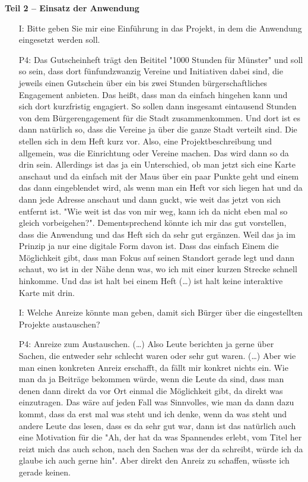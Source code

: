 \textbf{Teil 2 -- Einsatz der Anwendung}
\begin{itemize}
    \item[I:] Bitte geben Sie mir eine Einf{\"u}hrung in das Projekt, in dem die Anwendung eingesetzt werden soll.
    \item[P4:] Das Gutscheinheft tr{\"a}gt den Beititel "1000 Stunden f{\"u}r M{\"u}nster" und soll so sein, dass dort f{\"u}nfundzwanzig Vereine und Initiativen dabei sind, die jeweils einen Gutschein {\"u}ber ein bis zwei Stunden b{\"u}rgerschaftliches Engagement anbieten. Das hei{\ss}t, dass man da einfach hingehen kann und sich dort kurzfristig engagiert. So sollen dann insgesamt eintausend Stunden von dem B{\"u}rgerengagement f{\"u}r die Stadt zusammenkommen. Und dort ist es dann nat{\"u}rlich so, dass die Vereine ja {\"u}ber die ganze Stadt verteilt sind. Die stellen sich in dem Heft kurz vor. Also, eine Projektbeschreibung und allgemein, was die Einrichtung oder Vereine machen. Das wird dann so da drin sein. Allerdings ist das ja ein Unterschied, ob man jetzt sich eine Karte anschaut und da einfach mit der Maus {\"u}ber ein paar Punkte geht und einem das dann eingeblendet wird, als wenn man ein Heft vor sich liegen hat und da dann jede Adresse anschaut und dann guckt, wie weit das jetzt von sich entfernt ist. "Wie weit ist das von mir weg, kann ich da nicht eben mal so gleich vorbeigehen?". Dementsprechend k{\"o}nnte ich mir das gut vorstellen, dass die Anwendung und das Heft sich da sehr gut erg{\"a}nzen. Weil das ja im Prinzip ja nur eine digitale Form davon ist. Dass das einfach Einem die M{\"o}glichkeit gibt, dass man Fokus auf seinen Standort gerade legt und dann schaut, wo ist in der N{\"a}he denn was, wo ich mit einer kurzen Strecke schnell hinkomme. Und das ist halt bei einem Heft (\dots) ist halt keine interaktive Karte mit drin.
    \item[I:] Welche Anreize k{\"o}nnte man geben, damit sich B{\"u}rger {\"u}ber die eingestellten Projekte austauschen?
    \item[P4:] Anreize zum Austauschen. (\dots) Also Leute berichten ja gerne {\"u}ber Sachen, die entweder sehr schlecht waren oder sehr gut waren. (\dots) Aber wie man einen konkreten Anreiz erschafft, da f{\"a}llt mir konkret nichts ein. Wie man da ja Beitr{\"a}ge bekommen w{\"u}rde, wenn die Leute da sind, dass man denen dann direkt da vor Ort einmal die M{\"o}glichkeit gibt, da direkt was einzutragen. Das w{\"a}re auf jeden Fall was Sinnvolles, wie man da dann dazu kommt, dass da erst mal was steht und ich denke, wenn da was steht und andere Leute das lesen, dass es da sehr gut war, dann ist das nat{\"u}rlich auch eine Motivation f{\"u}r die "Ah, der hat da was Spannendes erlebt, vom Titel her reizt mich das auch schon, nach den Sachen was der da schreibt, w{\"u}rde ich da glaube ich auch gerne hin". Aber direkt den Anreiz zu schaffen, w{\"u}sste ich gerade keinen.

\end{itemize}
